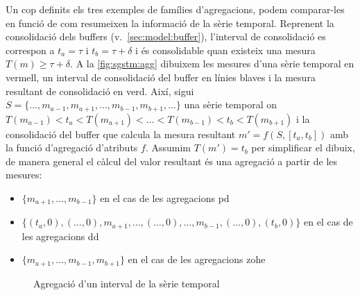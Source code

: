 Un cop definits els tres exemples de famílies d'agregacions, podem
comparar-les en funció de com resumeixen la informació de la sèrie
temporal. Reprenent la consolidació dels buffers
(v.~\autoref{sec:model:buffer}), l'interval de consolidació es
correspon a $t_a=\tau$ i $t_b=\tau+\delta$ i és consolidable quan
existeix una mesura $T(m)\geq\tau+\delta$. A la
\autoref{fig:sgstm:agg} dibuixem les mesures d'una sèrie temporal en
vermell, un interval de consolidació del buffer en línies blaves i la
mesura resultant de consolidació en verd.  Així, sigui
$S=\{\dotsc,m_{a-1},m_{a+1},\dotsc,m_{b-1},m_{b+1}, \ldots\}$ una
sèrie temporal on $ T(m_{a-1}) < t_a < T(m_{a+1}) < \dotsc <
T(m_{b-1}) < t_b < T(m_{b+1})$ i la consolidació del buffer que
calcula la mesura resultant $m'=f(S,[t_a,t_b])$ amb la funció
d'agregació d'atributs $f$.  Assumim $T(m')=t_b$ per simplificar el
dibuix, de manera general el càlcul del valor resultant és una
agregació a partir de les mesures:
\begin{itemize}
\item $\{m_{a+1},\dotsc,m_{b-1}\}$ en el cas de les agregacions \gls{pd}
\item $\{(t_a,0),(\ldots,0),m_{a+1},\dotsc,(\ldots,0),\dotsc,m_{b-1},(\ldots,0),(t_b,0)\}$ en el cas de les
  agregacions \gls{dd}
\item $\{m_{a+1},\dotsc,m_{b-1},m_{b+1}\}$ en el cas de les
  agregacions \gls{zohe}
\end{itemize}






\begin{figure}[tp]
  \centering
 

    
  \caption{Agregació d'un interval de la sèrie temporal}
  \label{fig:sgstm:agg}
\end{figure}






